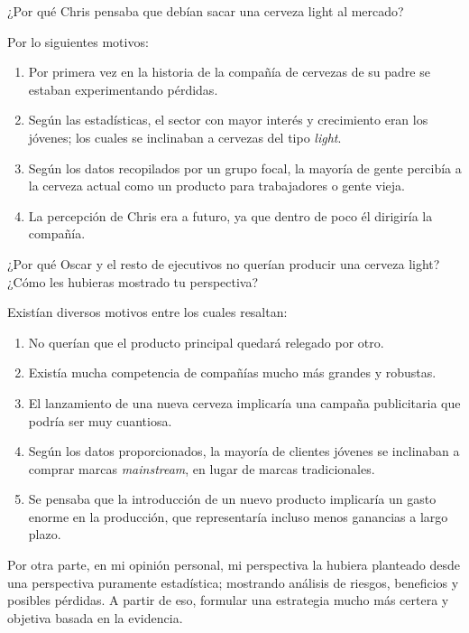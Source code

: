 






\begin{problema}
	¿Por qué Chris pensaba que debían sacar una cerveza light al mercado?
\end{problema}

\begin{sol}
	Por lo siguientes motivos: 
	\begin{enumerate}
		\item Por primera vez en la historia de la compañía de cervezas de su padre se estaban experimentando pérdidas.
		\item  Según las estadísticas, el sector con mayor interés y crecimiento eran los jóvenes; los cuales se inclinaban a cervezas del tipo \textit{light}. 
		\item Según los datos recopilados por un grupo focal, la mayoría de gente percibía a la cerveza actual como un producto para trabajadores o gente vieja. 
		\item La percepción de Chris era a futuro, ya que dentro de poco él dirigiría la compañía. 
	\end{enumerate}
\end{sol}


\begin{problema}
	¿Por qué Oscar y el resto de ejecutivos no querían producir una cerveza light? ¿Cómo les hubieras mostrado tu perspectiva?
\end{problema}
\begin{sol}
	Existían diversos motivos entre los cuales resaltan: 
	\begin{enumerate}
		\item No querían que el producto principal quedará relegado por otro. 
		\item Existía mucha competencia de compañías mucho más grandes y robustas. 
		\item El lanzamiento de una nueva cerveza implicaría una campaña publicitaria que podría ser muy cuantiosa. 
		\item Según los datos proporcionados, la mayoría de clientes jóvenes se inclinaban a comprar marcas \textit{mainstream}, en lugar de marcas tradicionales. 
		\item Se pensaba que la introducción de un nuevo producto implicaría un gasto enorme en la producción, que representaría incluso menos ganancias a largo plazo. 
	\end{enumerate}

Por otra parte, en mi opinión personal, mi perspectiva la hubiera planteado desde una perspectiva puramente estadística; mostrando análisis de riesgos, beneficios y posibles pérdidas. A partir de eso, formular una estrategia mucho más certera y objetiva basada en la evidencia. 
\end{sol}

